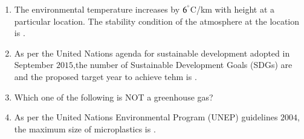 \documentclass[journal]{IEEEtran}
\numberwithin{equation}{enumi}
\numberwithin{figure}{enumi}
\begin{document}
\begin{enumerate}[start=1, label={Q\arabic*.}]
\begin{enumerate}
  \end{enumerate}
\item The environmental temperature increases by $6^{\degree}$C/km with height at a particular location. The stability condition of the atmosphere at the location is \underline{\hspace{1.5cm}}.
  \begin{enumerate} 
  \end{enumerate}
\item As per the United Nations agenda for sustainable development adopted in September $2015$,the number of Sustainable Development Goals (SDGs) are \underline{\hspace{1.5cm}} and the proposed target year to achieve tehm is \underline{\hspace{1.5cm}}.
  \begin{enumerate} 
  \end{enumerate}
\item Which one of the following is NOT a greenhouse gas?
 \begin{enumerate} 
  \end{enumerate}
\item As per the United Nations Environmental Program (UNEP) guidelines $2004$, the maximum size of microplastics is \underline{\hspace{1.5cm}}.

\end{enumerate}
\end{document}
